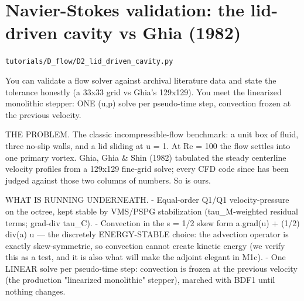 \chapter{Navier-Stokes validation: the lid-driven cavity vs Ghia (1982)}
\label{ch:D2_lid_driven_cavity}
\noindent\texttt{tutorials/D\_flow/D2\_lid\_driven\_cavity.py}\\[0.75em]
\begin{outcome}
You can validate a flow solver against archival
literature data and state the tolerance honestly (a 33x33 grid vs Ghia's
129x129). You meet the linearized monolithic stepper: ONE (u,p) solve per
pseudo-time step, convection frozen at the previous velocity.

THE PROBLEM. The classic incompressible-flow benchmark: a unit box of fluid,
three no-slip walls, and a lid sliding at u = 1. At Re = 100 the flow settles
into one primary vortex. Ghia, Ghia \& Shin (1982) tabulated the steady
centerline velocity profiles from a 129x129 fine-grid solve; every CFD code
since has been judged against those two columns of numbers. So is ours.

WHAT IS RUNNING UNDERNEATH.
- Equal-order Q1/Q1 velocity-pressure on the octree, kept stable by
  VMS/PSPG stabilization (tau\_M-weighted residual terms; grad-div tau\_C).
- Convection in the s = 1/2 skew form  a.grad(u) + (1/2) div(a) u  — the
  discretely ENERGY-STABLE choice: the advection operator is exactly
  skew-symmetric, so convection cannot create kinetic energy (we verify this
  as a test, and it is also what will make the adjoint elegant in M1c).
- One LINEAR solve per pseudo-time step: convection is frozen at the
  previous velocity (the production "linearized monolithic" stepper),
  marched with BDF1 until nothing changes.
\end{outcome}

